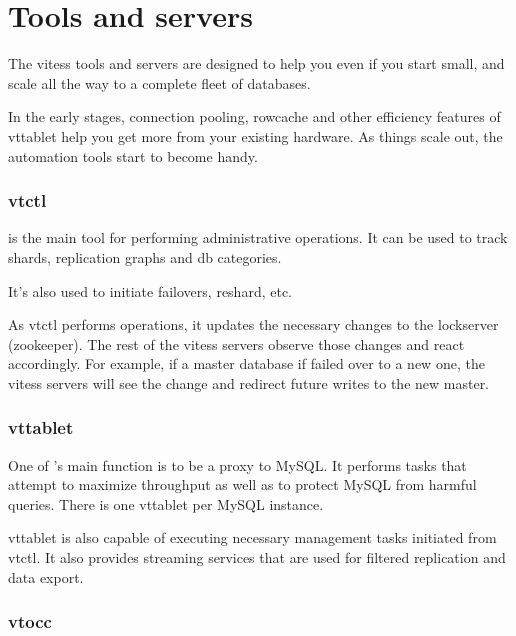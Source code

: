 \section{Tools and servers}\label{Tools-and-Servers}

The vitess tools and servers are designed to help you even
if you start small, and scale all the way to a complete fleet of databases.

In the early stages, connection pooling, rowcache and other
efficiency features of vttablet help you get more from your
existing hardware.
As things scale out, the automation tools start to become handy.

\subsubsection{vtctl}\hypertarget{vtctl}{}\label{vtctl}


 is the main tool for performing administrative operations. It can be used to track shards, replication graphs and
db categories.

It's also used to initiate failovers, reshard, etc.

As vtctl performs operations, it updates the necessary
changes to the lockserver (zookeeper).
The rest of the vitess servers observe those changes
and react accordingly.
For example, if a master database if failed over to a new
one, the vitess servers will see the change and redirect
future writes to the new master.

\subsubsection{vttablet}\hypertarget{vttablet}{}\label{vttablet}

One of  's main function is to be a proxy to MySQL.
It performs tasks that attempt to maximize throughput as
well as to protect MySQL from harmful queries. There is
one vttablet per MySQL instance.

vttablet is also capable of executing necessary management
tasks initiated from vtctl.
It also provides streaming services that are used for
filtered replication and data export.

\subsubsection{vtocc}\hypertarget{vtocc}{}\label{vtocc}


